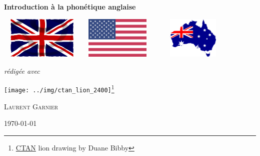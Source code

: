 \documentclass[12pt,a4paper]{report}
\begin{document}
\begin{titlepage}
	\centering
	
	\vspace{1cm}
	\vspace{1.5cm}
	{\huge\bfseries Introduction à la phonétique anglaise\par}
	\vspace{1cm}
        \includegraphics[width=0.3\textwidth,
        height=2cm]{../img/union-jack}\quad\includegraphics[width=0.3\textwidth,
        height=2cm]{../img/us-flag}\quad \includegraphics[width=0.3\textwidth, height=2cm]{../img/aussie-flag}\vspace{1cm}
	{\Large\itshape rédigée avec \href{https://en.wikipedia.org/wiki/XeTeX}{\XeLaTeX}\par}
	\vfill
        \texttt{[image: ../img/ctan\_lion\_2400]}\footnote{\href{https://ctan.org/lion/}{CTAN} lion drawing by Duane Bibby}\par\vspace{1cm}
        \vfill
        {\scshape\LARGE Laurent Garnier \par}
        \vfill

	{\large \today\par}
\end{titlepage}
\end{document}
